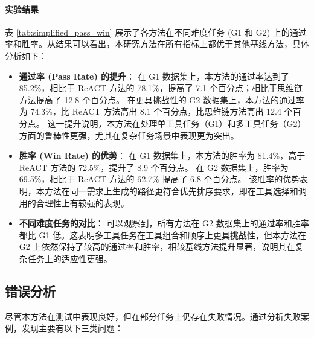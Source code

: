 \paragraph{实验结果}

表 \ref{tab:simplified_pass_win} 展示了各方法在不同难度任务 (G1 和 G2) 上的通过率和胜率。从结果可以看出，本研究方法在所有指标上都优于其他基线方法，具体分析如下：

\begin{itemize}
    \item \textbf{通过率 (Pass Rate) 的提升}：
    在 G1 数据集上，本方法的通过率达到了 85.2\%，相比于 ReACT 方法的 78.1\%，提高了 7.1 个百分点；相比于思维链方法提高了 12.8 个百分点。
    在更具挑战性的 G2 数据集上，本方法的通过率为 74.3\%，比 ReACT 方法高出 8.1 个百分点，比思维链方法高出 12.4 个百分点。
    这一提升说明，本方法在处理单工具任务（G1）和多工具任务（G2）方面的鲁棒性更强，尤其在复杂任务场景中表现更为突出。

    \item \textbf{胜率 (Win Rate) 的优势}：
    在 G1 数据集上，本方法的胜率为 81.4\%，高于 ReACT 方法的 72.5\%，提升了 8.9 个百分点。
    在 G2 数据集上，胜率为 69.5\%，相比于 ReACT 方法的 62.7\% 提高了 6.8 个百分点。
    该胜率的优势表明，本方法在同一需求上生成的路径更符合优先排序要求，即在工具选择和调用的合理性上有较强的表现。

    \item \textbf{不同难度任务的对比}：
    可以观察到，所有方法在 G2 数据集上的通过率和胜率都比 G1 低。这表明多工具任务在工具组合和顺序上更具挑战性，但本方法在 G2 上依然保持了较高的通过率和胜率，相较基线方法提升显著，说明其在复杂任务上的适应性更强。
\end{itemize}

\subsection{错误分析}
\label{subsec:error_analysis}

尽管本方法在测试中表现良好，但在部分任务上仍存在失败情况。通过分析失败案例，发现主要有以下三类问题：

